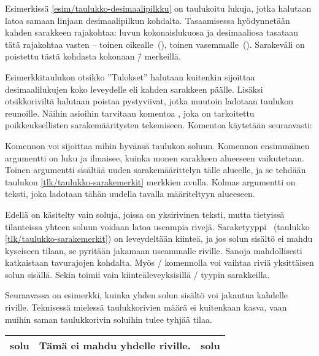 Esimerkissä \ref{esim/taulukko-desimaalipilkku} on taulukoitu lukuja,
jotka halutaan latoa samaan linjaan desimaalipilkun kohdalta.
Tasaamisessa hyödynnetään kahden sarakkeen rajakohtaa: luvun
kokonaislukuosa ja desimaaliosa tasataan tätä rajakohtaa vasten --
toinen oikealle~(), toinen vasemmalle~(). Sarakeväli
on poistettu tästä kohdasta kokonaan \=/ merkeillä.

Esimerkkitaulukon otsikko ''Tulokset'' halutaan kuitenkin sijoittaa
desimaalilukujen koko leveydelle eli kahden sarakkeen päälle. Lisäksi
otsikkoriviltä halutaan poistaa pystyviivat, jotka muutoin ladotaan
taulukon reunoille. Näihin asioihin tarvitaan komentoa
, joka on tarkoitettu poikkeuksellisten
sarakemääritysten tekemiseen. Komentoa käytetään seuraavasti:

\begin{koodilohkosis}
\end{koodilohkosis}

\noindent
Komennon  voi sijoittaa mihin hyvänsä taulukon
soluun. Komennon ensimmäinen argumentti  on luku ja ilmaisee,
kuinka monen sarakkeen alueeseen vaikutetaan. Toinen argumentti
 sisältää uuden sarakemäärittelyn tälle alueelle, ja
se tehdään taulukon \ref{tlk/taulukko-sarakemerkit} merkkien avulla.
Kolmas argumentti on teksti, joka ladotaan tähän uudella tavalla
määriteltyyn alueeseen.

Edellä on käsitelty vain soluja, joissa on yksirivinen teksti, mutta
tietyissä tilanteissa yhteen soluun voidaan latoa useampia rivejä.
Saraketyyppi~ (taulukko \ref{tlk/taulukko-sarakemerkit}) on
leveydeltään kiinteä, ja jos solun sisältö ei mahdu kyseiseen tilaan, se
pyritään jakamaan useammalle riville. Sanoja mahdollisesti katkaistaan
tavurajojen kohdalta. Myös \-/ komennolla voi vaihtaa
riviä yksittäisen solun sisällä. Sekin toimii vain kiinteäleveyksisillä
\-/ tyypin sarakkeilla.

Seuraavassa on esimerkki, kuinka yhden solun sisältö voi jakautua
kahdelle riville. Teknisessä mielessä taulukkorivien määrä ei kuitenkaan
kasva, vaan muihin saman taulukkorivin soluihin tulee tyhjää tilaa.

\komentoi{\keno}
\begin{koodilohkosis}
\begin{tabular}{|l|p{6.5em}|l|}
  \hline solu & Tämä ei mahdu yhdelle riville. & solu \\ \hline
\end{tabular}
\end{koodilohkosis}

